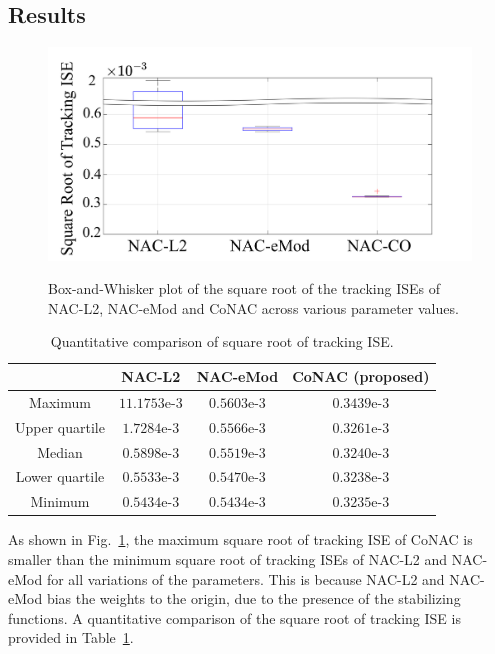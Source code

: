 \subsection{Results}

\begin{figure}[!t]      
    \centering
    {\includegraphics[width=.85\linewidth]{imgs/BoxWhisker.drawio.png}}
    \caption{
        Box-and-Whisker plot of the square root of the tracking ISEs of NAC-L2, NAC-eMod and CoNAC across various parameter values.
    }
    \label{chap3:fig:box-whisker}
\end{figure}

\begin{table}[!t]
    \renewcommand{\arraystretch}{1.3}
    \caption{Quantitative comparison of square root of tracking ISE.}
    \centering
    \begin{tabular}{|c||c|c|c|}
    \hline
     & \textbf{NAC-L2} & \textbf{NAC-eMod} & \textbf{CoNAC} (proposed) 
     \\
    \hline 
    Maximum         & $11.1753$e-3 & $0.5603$e-3 & $0.3439$e-3 \\
    \hline
    Upper quartile  & $1.7284$e-3 & $0.5566$e-3 & $0.3261$e-3 \\
    \hline
    Median          & $0.5898$e-3 & $0.5519$e-3 & $0.3240$e-3 \\
    \hline
    Lower quartile  & $0.5533$e-3 & $0.5470$e-3 & $0.3238$e-3 \\
    \hline
    Minimum         & $0.5434$e-3 & $0.5434$e-3 & $0.3235$e-3 \\
    \hline
    \end{tabular}
    \label{chap3:table:error_norm}
\end{table}

As shown in Fig.~\ref{chap3:fig:box-whisker}, the maximum square root of tracking ISE of CoNAC is smaller than the minimum square root of tracking ISEs of NAC-L2 and NAC-eMod for all variations of the parameters.
This is because NAC-L2 and NAC-eMod bias the weights to the origin, due to the presence of the stabilizing functions.
A quantitative comparison of the square root of tracking ISE is provided in Table~\ref{chap3:table:error_norm}.

